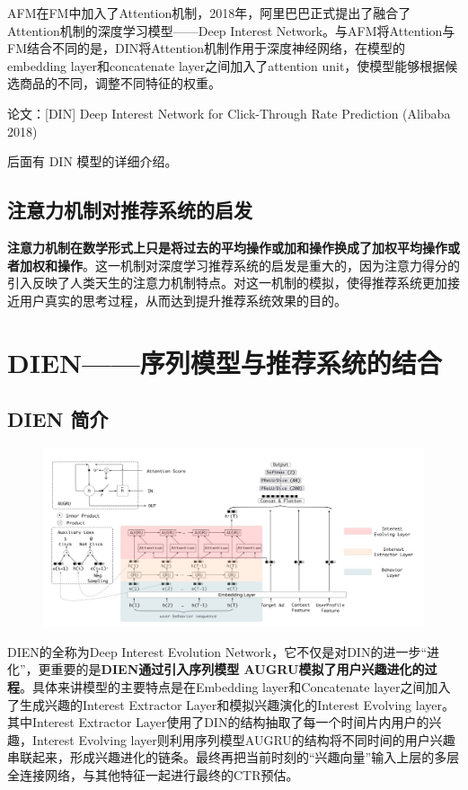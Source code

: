 \documentclass[12pt]{article}
\begin{document}
AFM在FM中加入了Attention机制，2018年，阿里巴巴正式提出了融合了Attention机制的深度学习模型——Deep Interest Network。与AFM将Attention与FM结合不同的是，DIN将Attention机制作用于深度神经网络，在模型的embedding layer和concatenate layer之间加入了attention unit，使模型能够根据候选商品的不同，调整不同特征的权重。

论文：[DIN] Deep Interest Network for Click-Through Rate Prediction (Alibaba 2018)

后面有 DIN 模型的详细介绍。

\subsection{注意力机制对推荐系统的启发}
\textbf{注意力机制在数学形式上只是将过去的平均操作或加和操作换成了加权平均操作或者加权和操作}。这一机制对深度学习推荐系统的启发是重大的，因为注意力得分的引入反映了人类天生的注意力机制特点。对这一机制的模拟，使得推荐系统更加接近用户真实的思考过程，从而达到提升推荐系统效果的目的。

\section{DIEN——序列模型与推荐系统的结合}
\subsection{DIEN 简介}
\begin{figure}[H]
    \centering
    \includegraphics[width=1\textwidth]{fig/Ali_DIEN_Structure.jpg}
\end{figure}

DIEN的全称为Deep Interest Evolution Network，它不仅是对DIN的进一步“进化”，更重要的是\textbf{DIEN通过引入序列模型 AUGRU模拟了用户兴趣进化的过程}。具体来讲模型的主要特点是在Embedding layer和Concatenate layer之间加入了生成兴趣的Interest Extractor Layer和模拟兴趣演化的Interest Evolving layer。其中Interest Extractor Layer使用了DIN的结构抽取了每一个时间片内用户的兴趣，Interest Evolving layer则利用序列模型AUGRU的结构将不同时间的用户兴趣串联起来，形成兴趣进化的链条。最终再把当前时刻的“兴趣向量”输入上层的多层全连接网络，与其他特征一起进行最终的CTR预估。
\end{document}
